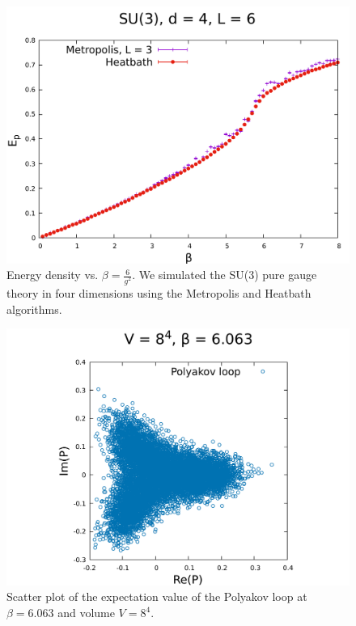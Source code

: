 \documentclass[12pt,a4paper]{article}
\begin{document}
\begin{center}
\begin{figure}
\includegraphics[scale=0.6]{../images/L=6_heatbath_L=3_metropolis.pdf}
\caption{Energy density vs. $\beta = \frac{6}{g^2}$. We simulated the SU(3) pure gauge theory in four dimensions using the Metropolis and Heatbath algorithms.}
\label{fig:Ep}
\end{figure}
\end{center}

\begin{center}
\begin{figure}
\includegraphics[scale=0.6]{../images/polyakov_loop.pdf}
\caption{Scatter plot of the expectation value of the Polyakov loop at $\beta = 6.063$ and volume $V = 8^4$.}
\label{fig:poly}
\end{figure}
\end{center}
\end{document}
